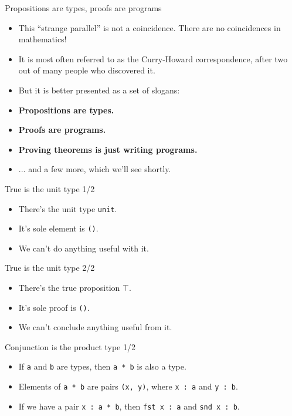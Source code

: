 \documentclass{beamer}
\newcommand{\m}[1]{\texttt{#1}}
\begin{document}
\begin{frame}{Propositions are types, proofs are programs}
\begin{itemize}
	\item This ``strange parallel'' is not a coincidence. There are no coincidences in mathematics!
	\item It is most often referred to as the Curry-Howard correspondence, after two out of many people who discovered it.
	\item But it is better presented as a set of slogans:
	\item \textbf{Propositions are types.}
	\item \textbf{Proofs are programs.}
	\item \textbf{Proving theorems is just writing programs.}
	\item ... and a few more, which we'll see shortly.
\end{itemize}
\end{frame}

\begin{frame}{True is the unit type 1/2}
\begin{itemize}
	\item There's the unit type \m{unit}.
	\item It's sole element is \m{()}.
	\item We can't do anything useful with it.
\end{itemize}
\end{frame}

\begin{frame}{True is the unit type 2/2}
\begin{itemize}
	\item There's the true proposition $\top$.
	\item It's sole proof is \m{()}.
	\item We can't conclude anything useful from it.
\end{itemize}
\end{frame}
	
\begin{frame}{Conjunction is the product type 1/2}
\begin{itemize}
	\item If \m{a} and \m{b} are types, then \m{a * b} is also a type.
	\item Elements of \m{a * b} are pairs \m{(x, y)}, where \m{x :\ a} and \m{y :\ b}.
	\item If we have a pair \m{x :\ a * b}, then \m{fst x :\ a} and \m{snd x :\ b}.
\end{itemize}
\end{frame}
\end{document}

